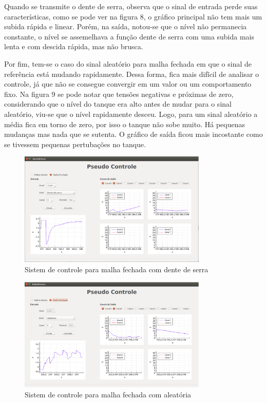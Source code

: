 \documentclass[a4paper,12pt]{article}
\begin{document}
Quando se transmite o dente de serra, observa que o sinal de entrada perde suas características, como se pode ver na figura 8, o gráfico principal não tem mais um subida rápida e linear. Porém, na saída, notou-se que o nível não permanecia constante, o nível se assemelhava a função dente de serra com uma subida mais lenta e com descida rápida, mas não brusca.  

Por fim, tem-se o caso do sinal aleatório para malha fechada em que o sinal de referência está  mudando rapidamente. Dessa forma, fica mais difĩcil de analisar o controle, já que não se consegue convergir em um valor ou um comportamento fixo. Na figura 9 se pode notar que tensões negativas e próximas de zero, considerando que o nível do tanque era alto antes de mudar para o sinal aleatório, viu-se que o nível rapidamente desceu. Logo, para um sinal aleatório a média fica em torno de zero, por isso o tanque não sobe muito. Há pequenas mudanças mas nada que se sutenta. O gráfico de saída ficou mais incostante como se tivessem pequenas pertubações no tanque.

\newpage

\begin{figure}[!h]
\centering
\includegraphics[width=0.8\textwidth]{mfechada-serra-15.eps}
\caption{Sistem de controle para malha fechada com dente de serra}
\label{Entrada Dente de serra - fechada}
\end{figure}

\begin{figure}[!h]
\centering
\includegraphics[width=0.8\textwidth]{mfechada-rand.eps}
\caption{Sistem de controle para malha fechada com aleatória}
\label{Entrada aleatória - fechada}
\end{figure}
\end{document}
